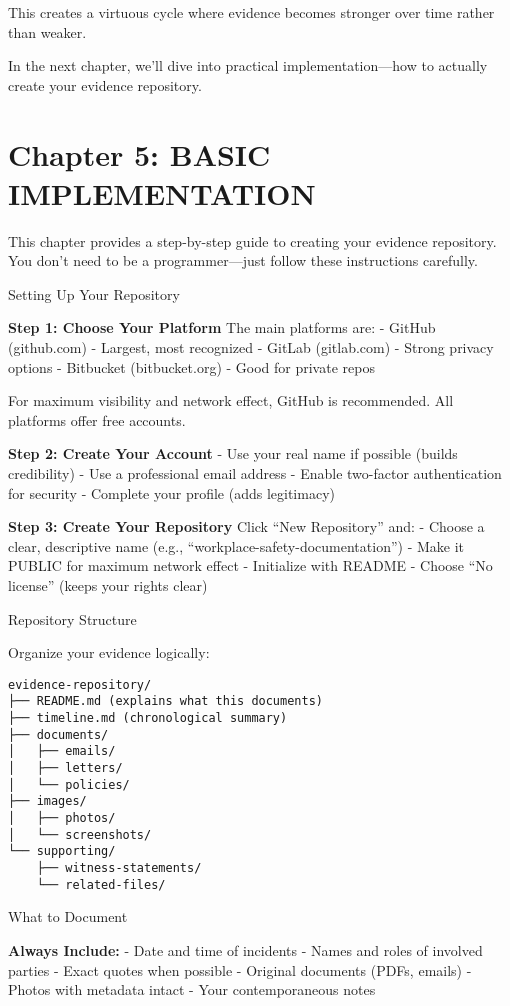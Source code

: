This creates a virtuous cycle where evidence becomes stronger over time
rather than weaker.

In the next chapter, we'll dive into practical implementation---how to
actually create your evidence repository.

\section{Chapter 5: BASIC
IMPLEMENTATION}\label{chapter-5-basic-implementation}

This chapter provides a step-by-step guide to creating your evidence
repository. You don't need to be a programmer---just follow these
instructions carefully.

Setting Up Your Repository

\textbf{Step 1: Choose Your Platform} The main platforms are: - GitHub
(github.com) - Largest, most recognized - GitLab (gitlab.com) - Strong
privacy options - Bitbucket (bitbucket.org) - Good for private repos

For maximum visibility and network effect, GitHub is recommended. All
platforms offer free accounts.

\textbf{Step 2: Create Your Account} - Use your real name if possible
(builds credibility) - Use a professional email address - Enable
two-factor authentication for security - Complete your profile (adds
legitimacy)

\textbf{Step 3: Create Your Repository} Click ``New Repository'' and: -
Choose a clear, descriptive name (e.g.,
``workplace-safety-documentation'') - Make it PUBLIC for maximum network
effect - Initialize with README - Choose ``No license'' (keeps your
rights clear)

Repository Structure

Organize your evidence logically:

\begin{verbatim}
evidence-repository/
├── README.md (explains what this documents)
├── timeline.md (chronological summary)
├── documents/
│   ├── emails/
│   ├── letters/
│   └── policies/
├── images/
│   ├── photos/
│   └── screenshots/
└── supporting/
    ├── witness-statements/
    └── related-files/
\end{verbatim}

What to Document

\textbf{Always Include:} - Date and time of incidents - Names and roles
of involved parties - Exact quotes when possible - Original documents
(PDFs, emails) - Photos with metadata intact - Your contemporaneous
notes

